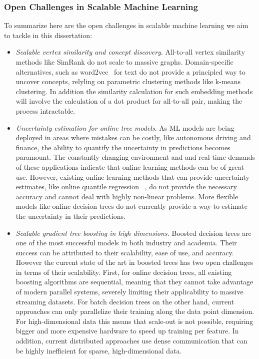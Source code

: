 \subsubsection*{Open Challenges in Scalable Machine Learning}

To summarize here are the open challenges in scalable machine learning
we aim to tackle in this dissertation:

\begin{itemize}
	\item \emph{Scalable vertex similarity and concept discovery}. All-to-all vertex similarity
	methods like SimRank do not scale to massive graphs. Domain-specific alternatives,
	such as word2vec~\cite{word2vec} for text do not provide a principled way to uncover
	concepts, relyling on parametric clustering methods like k-means clustering. In
	addition the similarity calculation for such embedding methods will involve the
	calculation of a dot product for all-to-all pair, making the process intractable.

	\item \emph{Uncertainty estimation for online tree models}. As ML models are being
	deployed in areas where mistakes can be costly, like autonomous driving and finance,
	the ability to quantify the uncertainty in predictions becomes paramount. The constantly
	changing environment and and real-time demands of these applications indicate that
	online learning methods can be of great use. However, existing online learning
	methods that can provide uncertainty estimates, like online quantile regression
	~\cite{koenker2005qr}, do not provide the necessary accuracy and cannot deal
	with highly non-linear problems. More flexible models like online decision trees
	do not currently provide a way to estimate the uncertainty in their predictions.

	\item \emph{Scalable gradient tree boosting in high dimensions.} Boosted
	decision trees are one of the most successful models in both industry and academia.
	Their success can be attributed to their scalability, ease of use, and accuracy.
	However the current state of the art in boosted trees has two open challenges
	in terms of their scalability.
	First, for online decision trees, all existing boosting algorithms are sequential,
	meaning that they cannot take advantage of modern parallel systems, severely limiting
	their applicability to massive streaming datasets. For batch decision trees on the other
	hand, current approaches can only parallelize their training along the data point
	dimension. For high-dimensional data this means that scale-out is not possible,
	requiring bigger and more expensive hardware to speed up training per feature.
	In addition, current distributed approaches use dense communication that can
	be highly inefficient for sparse, high-dimensional data.
\end{itemize}


